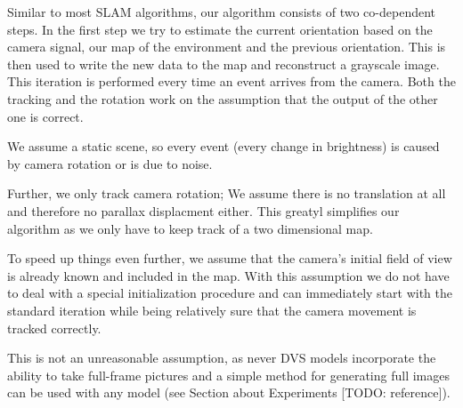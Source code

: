 Similar to most SLAM algorithms, our algorithm consists of two co-dependent
steps. In the first step we try to estimate the current orientation based on
the camera signal, our map of the environment and the previous orientation.
This is then used to write the new data to the map and reconstruct a grayscale
image. This iteration is performed every time an event arrives from the camera.
Both the tracking and the rotation work on the assumption that the output  of
the other one is correct.

We assume a static scene, so every event (every change in brightness) is caused
by camera rotation or is due to noise.

Further, we only track camera rotation; We assume there is no translation at
all and therefore no parallax displacment either. This greatyl simplifies our
algorithm as we only have to keep track of a two dimensional map.

To speed up things even further, we assume that the camera's initial field
of view is already known and included in the map. With this assumption we do
not have to deal with a special initialization procedure and can immediately
start with the standard iteration while being relatively sure that the camera
movement is tracked correctly.

This is not an unreasonable assumption, as never DVS models incorporate the
ability to take full-frame pictures and a simple method for generating full
images can be used with any model (see Section about Experiments [TODO:
reference]).
